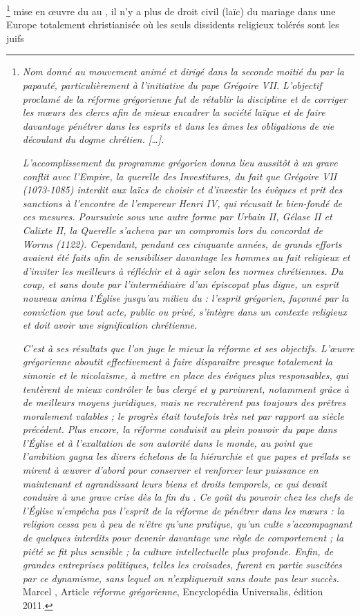 \footnote{\emph{Nom donné au mouvement animé et dirigé dans la seconde moitié du  par la papauté, particulièrement à l'initiative du pape Grégoire VII. L'objectif proclamé de la réforme grégorienne fut de rétablir la discipline et de corriger les mœurs des clercs afin de mieux encadrer la société laïque et de faire davantage pénétrer dans les esprits et dans les âmes les obligations de vie découlant du dogme chrétien. […].}

\emph{L'accomplissement du programme grégorien donna lieu aussitôt à un grave conflit avec l'Empire, la querelle des Investitures, du fait que Grégoire VII (1073-1085) interdit aux laïcs de choisir et d'investir les évêques et prit des sanctions à l'encontre de l'empereur Henri IV, qui récusait le bien-fondé de ces mesures. Poursuivie sous une autre forme par Urbain II, Gélase II et Calixte II, la Querelle s'acheva par un compromis lors du concordat de Worms (1122). Cependant, pendant ces cinquante années, de grands efforts avaient été faits afin de sensibiliser davantage les hommes au fait religieux et d'inviter les meilleurs à réfléchir et à agir selon les normes chrétiennes. Du coup, et sans doute par l'intermédiaire d'un épiscopat plus digne, un esprit nouveau anima l'Église jusqu'au milieu du  : l'esprit grégorien, façonné par la conviction que tout acte, public ou privé, s'intègre dans un contexte religieux et doit avoir une signification chrétienne.}

\emph{C'est à ses résultats que l'on juge le mieux la réforme et ses objectifs. L'œuvre grégorienne aboutit effectivement à faire disparaître presque totalement la simonie et le nicolaïsme, à mettre en place des évêques plus responsables, qui tentèrent de mieux contrôler le bas clergé et y parvinrent, notamment grâce à de meilleurs moyens juridiques, mais ne recrutèrent pas toujours des prêtres moralement valables ; le progrès était toutefois très net par rapport au siècle précédent. Plus encore, la réforme conduisit au plein pouvoir du pape dans l'Église et à l'exaltation de son autorité dans le monde, au point que l'ambition gagna les divers échelons de la hiérarchie et que papes et prélats se mirent à œuvrer d'abord pour conserver et renforcer leur puissance en maintenant et agrandissant leurs biens et droits temporels, ce qui devait conduire à une grave crise dès la fin du . Ce goût du pouvoir chez les chefs de l'Église n'empêcha pas l'esprit de la réforme de pénétrer dans les mœurs : la religion cessa peu à peu de n'être qu'une pratique, qu'un culte s'accompagnant de quelques interdits pour devenir davantage une règle de comportement ; la piété se fit plus sensible ; la culture intellectuelle plus profonde. Enfin, de grandes entreprises politiques, telles les croisades, furent en partie suscitées par ce dynamisme, sans lequel on n'expliquerait sans doute pas leur succès.}
Marcel , Article \emph{réforme grégorienne}, Encyclopédia Universalis, édition 2011.} mise en œuvre du  au , il n'y a plus de droit civil (laïc) du mariage dans une Europe totalement christianisée où les seuls dissidents religieux tolérés sont les juifs
